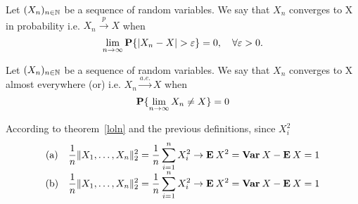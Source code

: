 \begin{definition}
Let $(X_n)_{n\in \N}$ be a sequence of random variables. We say that $X_n$ converges to X in probability i.e. $X_n \overset{p}{\to} X$ when
\[ \lim_{n\to\infty} \P\{ |X_n-X| > \varepsilon \} = 0,\hspace*{1em} \forall \varepsilon > 0. \]
\end{definition}

\begin{definition}
    Let $(X_n)_{n\in \N}$ be a sequence of random variables. We say that $X_n$ converges to X almost everywhere (or) i.e. $X_n \overset{a.e.}{\to} X$ when
    \[  \P\{ \lim_{n\to\infty} X_n  \neq X \} = 0\]
\end{definition}

\begin{remark}

\end{remark}

According to theorem~\ref{loln} and the previous definitions, since $X_i^2$
\[ \everymath{\displaystyle}
\begin{array}{cc}
    \text{(a)} & \frac{1}{n}\|X_1, \ldots, X_n\|_2^2 = \frac{1}{n} \sum_{i = 1}^n X_i^2 \to \E X^2 = \Var X - \E X = 1\\
    \text{(b)} & \frac{1}{n}\|X_1, \ldots, X_n\|_2^2 = \frac{1}{n} \sum_{i = 1}^n X_i^2 \to \E X^2 = \Var X - \E X = 1
\end{array} \]